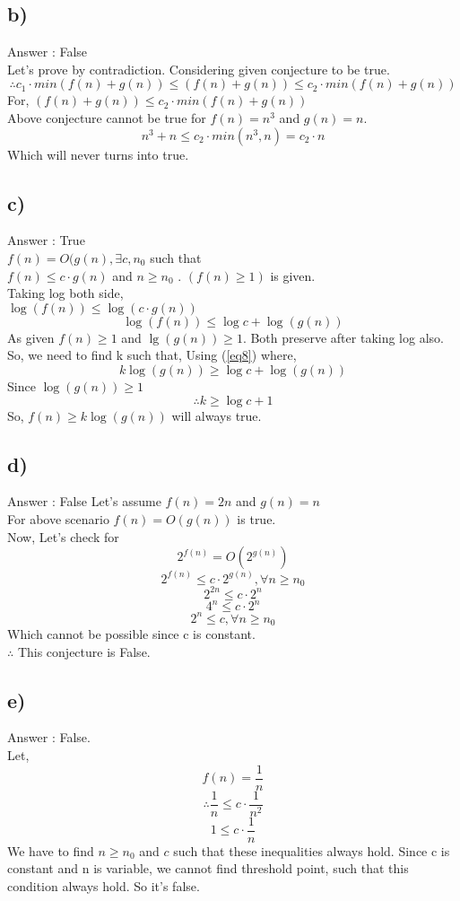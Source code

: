 \documentclass[a4paper, 11pt]{article}
\begin{document}
\subsection*{b)}
Answer : False\\
Let's prove by contradiction. Considering given conjecture to be true.
$$\therefore c_{1} \cdot min(f(n)+g(n)) \le (f(n)+g(n)) \le c_{2} \cdot min(f(n)+g(n))$$
For, $(f(n)+g(n)) \le c_{2} \cdot min(f(n)+g(n))$\\
Above conjecture cannot be true for $f(n) = n^3$ and $g(n)=n$.
$$n^3 + n \le c_{2} \cdot min(n^3,n) = c_{2} \cdot n$$
Which will never turns into true.

\subsection*{c)}
Answer : True\\
$f(n) = O(g(n), \exists c, n_{0} $ such that \\
$f(n) \le c \cdot g(n)$ and $n \ge n_{0}$ . $(f(n) \ge 1) $ is given.\\
Taking log both side,\\
$ \log (f(n)) \le \log (c \cdot g(n))$
\begin{equation}
\label{eq8}
\log(f(n)) \le \log c + \log(g(n))
\end{equation}
As given $f(n) \ge 1 $ and $\lg (g(n)) \ge 1 $. Both preserve after taking log also.\\ So, we need to find k such that, Using (\ref{eq8}) where,
$$k \log (g(n)) \ge \log c + \log (g(n))$$ Since $\log (g(n)) \ge 1 $
$$\therefore k \ge \log c +1 $$
So, $f(n) \ge k \log (g(n))$ will always true.

\subsection*{d)}
Answer : False
Let's assume $f(n) =  2n$ and $g(n)=n$\\
For above scenario $f(n) = O(g(n))$ is true.\\
Now, Let's check for $$2^{f(n)} = O(2^{g(n)})$$
$$2^{f(n)} \le c \cdot 2^{g(n)} , \forall n \ge n_{0}$$
$$2^{2n} \le c \cdot 2^n$$
$$4^n \le c \cdot 2^n$$
$$2^n \le c , \forall n \ge n_{0}$$
Which cannot be possible since c is constant.\\
$\therefore$ This conjecture is False.

\subsection*{e)}
Answer : False.\\
Let, $$f(n) = \frac{1}{n}$$
$$\therefore \frac {1}{n} \le c \cdot \frac{1}{n^2}$$
$$ 1 \le c \cdot \frac {1}{n}$$
We have to find $n \ge n_{0}$ and $c$ such that these inequalities always hold. Since c is constant and n is variable, we cannot find threshold point, such that this condition always hold. So it's false.
\end{document}
